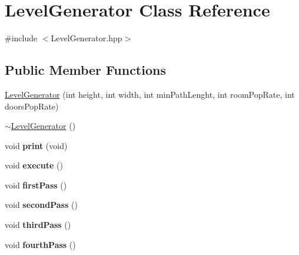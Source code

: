 \hypertarget{class_level_generator}{\section{Level\-Generator Class Reference}
\label{class_level_generator}
}


{\ttfamily \#include $<$Level\-Generator.\-hpp$>$}

\subsection*{Public Member Functions}
\begin{DoxyCompactItemize}
\item 
\hyperlink{class_level_generator_a2ed675e422aedcf5ecab936468627128}{Level\-Generator} (int height, int width, int min\-Path\-Lenght, int room\-Pop\-Rate, int doors\-Pop\-Rate)
\item 
\hyperlink{class_level_generator_a9bd612e10a3d769537ba042a76c0cb5f}{$\sim$\-Level\-Generator} ()
\item 
\hypertarget{class_level_generator_ad3a873efd53cec998e5b3cbec90b1e6d}{void {\bfseries print} (void)}\label{class_level_generator_ad3a873efd53cec998e5b3cbec90b1e6d}

\item 
\hypertarget{class_level_generator_a0adda93371151dcbda015fd4a9a5b971}{void {\bfseries execute} ()}\label{class_level_generator_a0adda93371151dcbda015fd4a9a5b971}

\item 
\hypertarget{class_level_generator_a67392d5702d8bb9b28d3b87cfa4f4435}{void {\bfseries first\-Pass} ()}\label{class_level_generator_a67392d5702d8bb9b28d3b87cfa4f4435}

\item 
\hypertarget{class_level_generator_aaed4a6d35bf4ea14a1d472b247720f46}{void {\bfseries second\-Pass} ()}\label{class_level_generator_aaed4a6d35bf4ea14a1d472b247720f46}

\item 
\hypertarget{class_level_generator_a8e8540de5d26ae5fd37f01863bb3a3ab}{void {\bfseries third\-Pass} ()}\label{class_level_generator_a8e8540de5d26ae5fd37f01863bb3a3ab}

\item 
\hypertarget{class_level_generator_a9b9e75025c7dcacb88bcb717f2aa9f3b}{void {\bfseries fourth\-Pass} ()}\label{class_level_generator_a9b9e75025c7dcacb88bcb717f2aa9f3b}


\end{DoxyCompactItemize}
